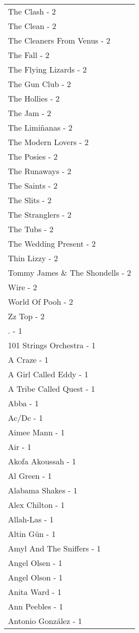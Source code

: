 \documentclass[
]{article}
\begin{document}
\begin{longtable}{l}
The Clash - 2 \\ 
The Clean - 2 \\ 
The Cleaners From Venus - 2 \\ 
The Fall - 2 \\ 
The Flying Lizards - 2 \\ 
The Gun Club - 2 \\ 
The Hollies - 2 \\ 
The Jam - 2 \\ 
The Limiñanas - 2 \\ 
The Modern Lovers - 2 \\ 
The Posies - 2 \\ 
The Runaways - 2 \\ 
The Saints - 2 \\ 
The Slits - 2 \\ 
The Stranglers - 2 \\ 
The Tubs - 2 \\ 
The Wedding Present - 2 \\ 
Thin Lizzy - 2 \\ 
Tommy James \& The Shondells - 2 \\ 
Wire - 2 \\ 
World Of Pooh - 2 \\ 
Zz Top - 2 \\ 
. - 1 \\ 
101 Strings Orchestra - 1 \\ 
A Craze - 1 \\ 
A Girl Called Eddy - 1 \\ 
A Tribe Called Quest - 1 \\ 
Abba - 1 \\ 
Ac/Dc - 1 \\ 
Aimee Mann - 1 \\ 
Air - 1 \\ 
Akofa Akoussah - 1 \\ 
Al Green - 1 \\ 
Alabama Shakes - 1 \\ 
Alex Chilton - 1 \\ 
Allah-Las - 1 \\ 
Altin Gün - 1 \\ 
Amyl And The Sniffers - 1 \\ 
Angel Olsen - 1 \\ 
Angel Olson - 1 \\ 
Anita Ward - 1 \\ 
Ann Peebles - 1 \\ 
Antonio González - 1 \\ 

\end{longtable}
\end{document}
